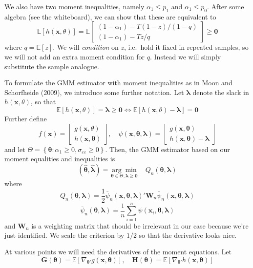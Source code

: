 \documentclass[12pt]{article}
\begin{document}
We also have two moment inequalities, namely $\alpha_1 \leq p_1$ and $\alpha_1 \leq p_0$.
After some algebra (see the whiteboard), we can show that these are equivalent to
\[
  \mathbb{E}\left[ h(\mathbf{x},\theta) \right] = \mathbb{E}
  \left[
  \begin{array}{c}
    (1 - \alpha_1) - T(1 - z)/(1 - q)\\
    (1 - \alpha_1) - Tz/q
  \end{array}
\right] \geq \mathbf{0}
\]
where $q = \mathbb{E}[z]$.
We will \emph{condition} on $z$, i.e.\ hold it fixed in repeated samples, so we will not add an extra moment condition for $q$.
Instead we will simply substitute the sample analogue.

To formulate the GMM estimator with moment inequalities as in Moon and Schorfheide (2009), we introduce some further notation.
Let $\boldsymbol{\lambda}$ denote the slack in $h(\mathbf{x}, \theta)$, so that
\[
  \mathbb{E}[h(\mathbf{x},\theta)] = \boldsymbol{\lambda} \geq \mathbf{0} \iff \mathbb{E}[h(\mathbf{x}, \theta) - \boldsymbol{\lambda}] = \mathbf{0}
\]
Further define
\[
  f(\mathbf{x}) = \left[
  \begin{array}{c}
    g(\mathbf{x},\theta) \\ h(\mathbf{x},\boldsymbol{\theta})
  \end{array}
\right], \quad
\psi(\mathbf{x}, \boldsymbol{\theta}, \boldsymbol{\lambda}) = 
\left[
\begin{array}{c}
  g(\mathbf{x}, \boldsymbol{\theta})\\
  h(\mathbf{x}, \boldsymbol{\theta}) - \boldsymbol{\lambda}
\end{array}
\right]
\]
and let $\Theta = \left\{ \boldsymbol{\theta}\colon \alpha_1 \geq 0, \sigma_{\varepsilon\varepsilon}\geq 0 \right\}$.
Then, the GMM estimator based on our moment equalities and inequalities is
\[
  (\widehat{\boldsymbol{\theta}}, \widehat{\boldsymbol{\lambda}}) = \underset{\boldsymbol{\theta} \in \Theta, \boldsymbol{\lambda} \geq \mathbf{0}}{\arg\min} \quad Q_n(\boldsymbol{\theta}, \boldsymbol{\lambda})
\]
where
\[ 
  Q_n(\boldsymbol{\theta}, \boldsymbol{\lambda}) = \frac{1}{2}\bar{\psi}_n(\mathbf{x},\boldsymbol{\theta}, \boldsymbol{\lambda})' \mathbf{W}_n \bar{\psi}_n(\mathbf{x}, \boldsymbol{\theta}, \boldsymbol{\lambda})
\]
\[
  \bar{\psi}_n(\boldsymbol{\theta}, \boldsymbol{\lambda}) = \frac{1}{n}\sum_{i=1}^n \psi(\mathbf{x}_i, \boldsymbol{\theta}, \boldsymbol{\lambda}) 
\]
and $\mathbf{W}_n$ is a weighting matrix that should be irrelevant in our case because we're just identified.
We scale the criterion by $1/2$ so that the derivative looks nice.

At various points we will need the derivatives of the moment equations.
Let
\[
  \mathbf{G}(\boldsymbol{\theta}) = \mathbb{E}[\nabla_{\boldsymbol{\theta}'} g(\mathbf{x},\boldsymbol{\theta})], \quad \mathbf{H}(\boldsymbol{\theta}) = \mathbb{E}[\nabla_{\boldsymbol{\theta}'} h(\mathbf{x},\boldsymbol{\theta})]
\]
\end{document}
